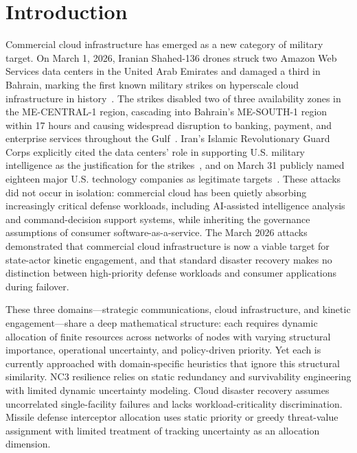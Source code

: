 \documentclass[runningheads]{llncs}
\begin{document}
\section{Introduction}
\label{sec:intro}

Commercial cloud infrastructure has emerged as a new category of military target. On March 1, 2026, Iranian Shahed-136 drones struck two Amazon Web Services data centers in the United Arab Emirates and damaged a third in Bahrain, marking the first known military strikes on hyperscale cloud infrastructure in history~\cite{cnbc1,register1}. The strikes disabled two of three availability zones in the ME-CENTRAL-1 region, cascading into Bahrain's ME-SOUTH-1 region within 17 hours and causing widespread disruption to banking, payment, and enterprise services throughout the Gulf~\cite{cnbc2}. Iran's Islamic Revolutionary Guard Corps explicitly cited the data centers' role in supporting U.S. military intelligence as the justification for the strikes~\cite{cnbc3}, and on March 31 publicly named eighteen major U.S. technology companies as legitimate targets~\cite{conversation}. These attacks did not occur in isolation: commercial cloud has been quietly absorbing increasingly critical defense workloads, including AI-assisted intelligence analysis and command-decision support systems, while inheriting the governance assumptions of consumer software-as-a-service. The March 2026 attacks demonstrated that commercial cloud infrastructure is now a viable target for state-actor kinetic engagement, and that standard disaster recovery makes no distinction between high-priority defense workloads and consumer applications during failover.

These three domains---strategic communications, cloud infrastructure, and kinetic engagement---share a deep mathematical structure: each requires dynamic allocation of finite resources across networks of nodes with varying structural importance, operational uncertainty, and policy-driven priority. Yet each is currently approached with domain-specific heuristics that ignore this structural similarity. NC3 resilience relies on static redundancy and survivability engineering with limited dynamic uncertainty modeling. Cloud disaster recovery assumes uncorrelated single-facility failures and lacks workload-criticality discrimination. Missile defense interceptor allocation uses static priority or greedy threat-value assignment with limited treatment of tracking uncertainty as an allocation dimension.
\end{document}
